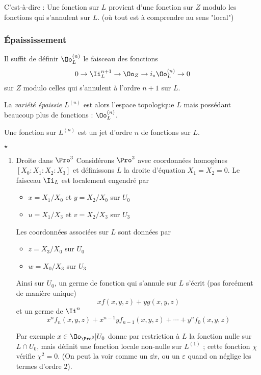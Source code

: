 \documentclass[a4paper]{amsart}
\begin{document}
C'est-à-dire : Une fonction sur \(L\) provient d'une fonction sur \(Z\) modulo les fonctions qui s'annulent sur \(L\). (où tout est à comprendre au sens "local")

\subsubsection{Épaississement}
\label{sec:orgheadline4}
Il suffit de définir \(\Oo_L^{(n)}\) le faisceau des fonctions
\[
0 \to \Ii^{n+1}_L \to \Oo_Z \to i_* \Oo_L^{(n)} \to 0
\]
sur \(Z\) modulo celles qui s'annulent à l'ordre \(n+1\) sur \(L\).

La \emph{variété épaissie} \(L^{(n)}\) est alors l'espace topologique \(L\) mais possédant beaucoup plus de fonctions : \(\Oo^{(n)}_L\).

Une fonction sur \(L^{(n)}\) est un jet d'ordre \(n\) de fonctions sur \(L\).

{\color{DarkRed}\(\star\)}

\begin{enumerate}
\item Droite dans \(\Pro^3\)
\label{sec:orgheadline3}
Considérons \(\Pro^3\) avec coordonnées homogènes \([X_0:X_1:X_2:X_3]\) et définissons \(L\) la droite d'équation \(X_1=X_2= 0\). Le faisceau \(\Ii_L\) est localement engendré par
\begin{itemize}
\item \(x = X_1/X_0\) et \(y = X_2/X_0\) sur \(U_0\)
\item \(u = X_1/X_3\) et \(v = X_2/X_3\) sur \(U_3\)
\end{itemize}
Les coordonnées associées sur \(L\) sont données par
\begin{itemize}
\item \(z = X_3/X_0\) sur \(U_0\)
\item \(w = X_0/X_3\) sur \(U_3\)
\end{itemize}

Ainsi sur \(U_0\), un germe de fonction qui s'annule sur \(L\) s'écrit (pas forcément de manière unique)
\[
xf(x,y,z) + yg(x,y,z)
\]
et un germe de \(\Ii^n\)
\[
x^nf_n(x,y,z) + x^{n-1}yf_{n-1}(x,y,z) + \cdots + y^nf_0(x,y,z)
\]

Par exemple \(x \in \Oo_{\Pro^3}\vert U_0\) donne par restriction à \(L\) la fonction nulle sur \(L \cap U_0\), mais définit une fonction locale non-nulle sur \(L^{(1)}\) ; cette fonction \(\chi\) vérifie \(\chi^2 = 0\). (On peut la voir comme un \(\dd x\), ou un \(\varepsilon\) quand on néglige les termes d'ordre \(2\)).
\end{enumerate}
\end{document}
